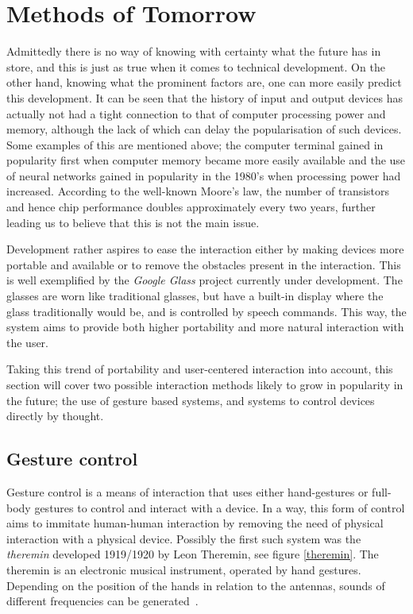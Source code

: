 
\section{Methods of Tomorrow}
\label{future}
Admittedly there is no way of knowing with certainty what the future has in store, and this is just as true when it comes to technical development. On the other hand, knowing what the prominent factors are, one can more easily predict this development. It can be seen that the history of input and output devices has actually not had a tight connection to that of computer processing power and memory, although the lack of which can delay the popularisation of such devices. Some examples of this are mentioned above; the computer terminal gained in popularity first when computer memory became more easily available and the use of neural networks gained in popularity in the 1980's when processing power had increased. According to the well-known Moore's law, the number of transistors and hence chip performance doubles approximately every two years, further leading us to believe that this is not the main issue.

Development rather aspires to ease the interaction either by making devices more portable and available or to remove the obstacles present in the interaction. This is well exemplified by the \emph{Google Glass} project currently under development. The glasses are worn like traditional glasses, but have a built-in display where the glass traditionally would be, and is controlled by speech commands. This way, the system aims to provide both higher portability and more natural interaction with the user.

Taking this trend of portability and user-centered interaction into account, this section will cover two possible interaction methods likely to grow in popularity in the future; the use of gesture based systems, and systems to control devices directly by thought. 


\subsection{Gesture control}
Gesture control is a means of interaction that uses either hand-gestures or full-body gestures to control and interact with a device. In a way, this form of control aims to immitate human-human interaction by removing the need of physical interaction with a physical device. Possibly the first such system was the \emph{theremin} developed 1919/1920 by Leon Theremin, see figure \ref{theremin}. The theremin is an electronic musical instrument, operated by hand gestures. Depending on the position of the hands in relation to the antennas, sounds of different frequencies can be generated~\cite{thereminpatent}.

